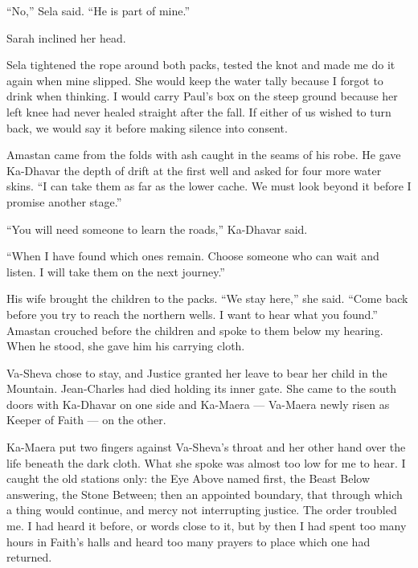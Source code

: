``No,'' Sela said. ``He is part of mine.''\par

Sarah inclined her head.\par

Sela tightened the rope around both packs, tested the knot and made me do it again when mine slipped. She would keep the water tally because I forgot to drink when thinking. I would carry Paul's box on the steep ground because her left knee had never healed straight after the fall. If either of us wished to turn back, we would say it before making silence into consent.\par

Amastan came from the folds with ash caught in the seams of his robe. He gave Ka-Dhavar the depth of drift at the first well and asked for four more water skins. ``I can take them as far as the lower cache. We must look beyond it before I promise another stage.''\par

``You will need someone to learn the roads,'' Ka-Dhavar said.\par

``When I have found which ones remain. Choose someone who can wait and listen. I will take them on the next journey.''\par

His wife brought the children to the packs. ``We stay here,'' she said. ``Come back before you try to reach the northern wells. I want to hear what you found.'' Amastan crouched before the children and spoke to them below my hearing. When he stood, she gave him his carrying cloth.\par

Va-Sheva chose to stay, and Justice granted her leave to bear her child in the Mountain. Jean-Charles had died holding its inner gate. She came to the south doors with Ka-Dhavar on one side and Ka-Maera --- Va-Maera newly risen as Keeper of Faith --- on the other.\par

Ka-Maera put two fingers against Va-Sheva's throat and her other hand over the life beneath the dark cloth. What she spoke was almost too low for me to hear. I caught the old stations only: the Eye Above named first, the Beast Below answering, the Stone Between; then an appointed boundary, that through which a thing would continue, and mercy not interrupting justice. The order troubled me. I had heard it before, or words close to it, but by then I had spent too many hours in Faith's halls and heard too many prayers to place which one had returned.\par

